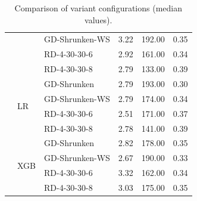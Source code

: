 \begin{table}[ht]
\begin{tabular}{lllrrr}
		                             &                          & GD-Shrunken-WS   & 3.22         & 192.00              & 0.35                    \\\cmidrule(lr){3-6}
		                             &                          & RD-4-30-30-6     & 2.92         & 161.00              & 0.34                    \\\cmidrule(lr){3-6}
		                             &                          & RD-4-30-30-8     & 2.79         & 133.00              & 0.39                    \\\cmidrule(lr){2-6}
		                             & \multirow[t]{4}{*}{LR}   & GD-Shrunken      & 2.79         & 193.00              & 0.30                    \\\cmidrule(lr){3-6}
		                             &                          & GD-Shrunken-WS   & 2.79         & 174.00              & 0.34                    \\\cmidrule(lr){3-6}
		                             &                          & RD-4-30-30-6     & 2.51         & 171.00              & 0.37                    \\\cmidrule(lr){3-6}
		                             &                          & RD-4-30-30-8     & 2.78         & 141.00              & 0.39                    \\\cmidrule(lr){2-6}
		                             & \multirow[t]{4}{*}{XGB}  & GD-Shrunken      & 2.82         & 178.00              & 0.35                    \\\cmidrule(lr){3-6}
		                             &                          & GD-Shrunken-WS   & 2.67         & 190.00              & 0.33                    \\\cmidrule(lr){3-6}
		                             &                          & RD-4-30-30-6     & 3.32         & 162.00              & 0.34                    \\\cmidrule(lr){3-6}
		                             &                          & RD-4-30-30-8     & 3.03         & 175.00              & 0.35                    \\
		\bottomrule
	\end{tabular}
	\caption{Comparison of variant configurations (median values).}
\end{table}


\clearpage


